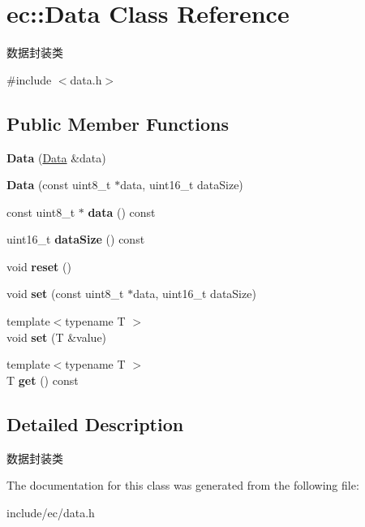 \hypertarget{classec_1_1Data}{\section{ec\-:\-:Data Class Reference}
\label{classec_1_1Data}
}


数据封装类  




{\ttfamily \#include $<$data.\-h$>$}

\subsection*{Public Member Functions}
\begin{DoxyCompactItemize}
\item 
\hypertarget{classec_1_1Data_a854458122b092f6dcbe7094d9751a7ed}{{\bfseries Data} (\hyperlink{classec_1_1Data}{Data} \&data)}\label{classec_1_1Data_a854458122b092f6dcbe7094d9751a7ed}

\item 
\hypertarget{classec_1_1Data_a4e3da6c5485f0a524fd94ec0cf801e1b}{{\bfseries Data} (const uint8\-\_\-t $\ast$data, uint16\-\_\-t data\-Size)}\label{classec_1_1Data_a4e3da6c5485f0a524fd94ec0cf801e1b}

\item 
\hypertarget{classec_1_1Data_a79c2d6256dc77dba3a1983099440242a}{const uint8\-\_\-t $\ast$ {\bfseries data} () const }\label{classec_1_1Data_a79c2d6256dc77dba3a1983099440242a}

\item 
\hypertarget{classec_1_1Data_a4aab0245eeaacbe7c75816012fac2612}{uint16\-\_\-t {\bfseries data\-Size} () const }\label{classec_1_1Data_a4aab0245eeaacbe7c75816012fac2612}

\item 
\hypertarget{classec_1_1Data_a57e26af81dbcafe536ce7df9e90855ed}{void {\bfseries reset} ()}\label{classec_1_1Data_a57e26af81dbcafe536ce7df9e90855ed}

\item 
\hypertarget{classec_1_1Data_acfebf854396156e906207793bd68ce54}{void {\bfseries set} (const uint8\-\_\-t $\ast$data, uint16\-\_\-t data\-Size)}\label{classec_1_1Data_acfebf854396156e906207793bd68ce54}

\item 
\hypertarget{classec_1_1Data_a36735929f9c2f2cc01911c63a75eb222}{{\footnotesize template$<$typename T $>$ }\\void {\bfseries set} (T \&value)}\label{classec_1_1Data_a36735929f9c2f2cc01911c63a75eb222}

\item 
\hypertarget{classec_1_1Data_ada49387405c041e27c079772dcc55cfb}{{\footnotesize template$<$typename T $>$ }\\T {\bfseries get} () const }\label{classec_1_1Data_ada49387405c041e27c079772dcc55cfb}

\end{DoxyCompactItemize}


\subsection{Detailed Description}
数据封装类 

The documentation for this class was generated from the following file\-:\begin{DoxyCompactItemize}
\item 
include/ec/data.\-h\end{DoxyCompactItemize}
